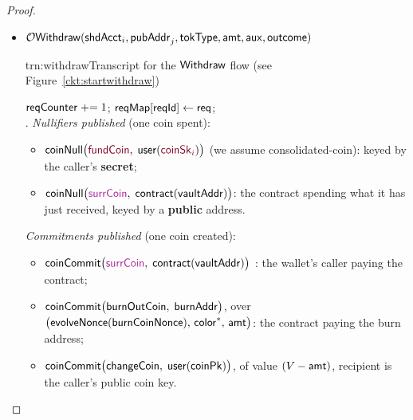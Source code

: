 \begin{proof}
\begin{itemize} [label=$\blacksquare$]
\begin{itemize}
\item $\mathcal{O}\mathsf{Withdraw}(\mathsf{shdAcct}_i, \mathsf{pubAddr}_j, \mathsf{tokType}, \mathsf{amt}, \mathsf{aux}, \mathsf{outcome})$
\begin{TxtBox}{trn:withdraw}{Transcript for the $\mathsf{Withdraw}$ flow}
 \upd{$\cktStartWithdraw$} (see Figure~\ref{ckt:startwithdraw})
\begin{OutList}
\oitem{\Dvault} $\mathsf{reqCounter} \mathrel{+}= 1$; \; $\mathsf{reqMap}[\mathsf{reqId}] \gets \mathsf{req}$; \;\\
  .
\oitem{\Dshd} \emph{Nullifiers published} (one coin spent):
  \begin{itemize}[nosep,leftmargin=1.3em,topsep=1pt]
  \item \bluedot $\coinNull\bigl(\secret{\coinFund},\; \mathsf{user}(\secret{\coinsk_i})\bigr)$ (we assume consolidated-coin):
        keyed by the caller's \textbf{secret};
  \item \bluedot $\coinNull\bigl(\freshrn{\coinIn},\; \mathsf{contract}(\vaultAddr)\bigr)$: the contract
        spending what it has just received, keyed by a \textbf{public} address.
  \end{itemize}
  \emph{Commitments published} (one coin created):
  \begin{itemize}[nosep,leftmargin=1.3em,topsep=1pt]
  \item \bluedot $\coinCommit\bigl(\freshrn{\coinIn},\; \mathsf{contract}(\vaultAddr)\bigr)$ : the wallet's caller paying the contract;
  \item \bluedot $\mathsf{coinCommit}\bigl(\mathsf{burnOutCoin},\; \mathsf{burnAddr}\bigr)$, over
        $\bigl(\mathsf{evolveNonce}(\mathsf{burnCoinNonce}),\, \mathsf{color}^{*},\, \mathsf{amt}\bigr)$: the contract
        paying the burn address;
  \item \bluedot $\mathsf{coinCommit}\bigl(\mathsf{changeCoin},\; \mathsf{user}(\mathsf{coinPk})\bigr)$, of value
        $(V - \mathsf{amt})$, recipient is the caller's public coin key.
  \end{itemize}
\end{OutList}


\end{TxtBox}
\end{itemize}
\end{itemize}
\end{proof}
